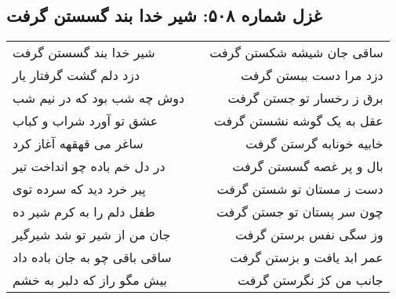 \begin{center}
\section*{غزل شماره ۵۰۸: شیر خدا بند گسستن گرفت}
\label{sec:0508}
\begin{longtable}{l p{0.5cm} r}
شیر خدا بند گسستن گرفت
&&
ساقی جان شیشه شکستن گرفت
\\
دزد دلم گشت گرفتار یار
&&
دزد مرا دست ببستن گرفت
\\
دوش چه شب بود که در نیم شب
&&
برق ز رخسار تو جستن گرفت
\\
عشق تو آورد شراب و کباب
&&
عقل به یک گوشه نشستن گرفت
\\
ساغر می قهقهه آغاز کرد
&&
خابیه خونابه گرستن گرفت
\\
در دل خم باده چو انداخت تیر
&&
بال و پر غصه گسستن گرفت
\\
پیر خرد دید که سرده توی
&&
دست ز مستان تو شستن گرفت
\\
طفل دلم را به کرم شیر ده
&&
چون سر پستان تو جستن گرفت
\\
جان من از شیر تو شد شیرگیر
&&
وز سگی نفس برستن گرفت
\\
ساقی باقی چو به جان باده داد
&&
عمر ابد یافت و بزستن گرفت
\\
بیش مگو راز که دلبر به خشم
&&
جانب من کژ نگرستن گرفت
\\
\end{longtable}
\end{center}

